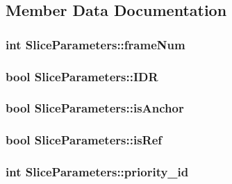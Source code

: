 \subsection{Member Data Documentation}
\hypertarget{struct_slice_parameters_a20319af06c76e833936a009f3c38d4ef}{
\subsubsection[{frameNum}]{\setlength{\rightskip}{0pt plus 5cm}int {\bf SliceParameters::frameNum}}}
\label{struct_slice_parameters_a20319af06c76e833936a009f3c38d4ef}
\hypertarget{struct_slice_parameters_a60f8fe21acd611ec6892e47a2c6029e3}{
\subsubsection[{IDR}]{\setlength{\rightskip}{0pt plus 5cm}bool {\bf SliceParameters::IDR}}}
\label{struct_slice_parameters_a60f8fe21acd611ec6892e47a2c6029e3}
\hypertarget{struct_slice_parameters_af8a7ea94e92b177c38277af8b827eb62}{
\subsubsection[{isAnchor}]{\setlength{\rightskip}{0pt plus 5cm}bool {\bf SliceParameters::isAnchor}}}
\label{struct_slice_parameters_af8a7ea94e92b177c38277af8b827eb62}
\hypertarget{struct_slice_parameters_a7e551828136a39ab347f77457aa11dbb}{
\subsubsection[{isRef}]{\setlength{\rightskip}{0pt plus 5cm}bool {\bf SliceParameters::isRef}}}
\label{struct_slice_parameters_a7e551828136a39ab347f77457aa11dbb}
\hypertarget{struct_slice_parameters_a82aa216a74ffaa7d1859aa1cfe135a8b}{
\subsubsection[{priority\_\-id}]{\setlength{\rightskip}{0pt plus 5cm}int {\bf SliceParameters::priority\_\-id}}}
